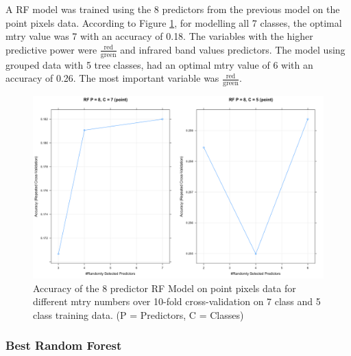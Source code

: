 \documentclass[12pt,twoside]{reedthesis}
\begin{document}
A RF model was trained using the 8 predictors from the previous model on the point pixels data. According to Figure \ref{fig:rf8c}, for modelling all 7 classes, the optimal mtry value was 7 with an accuracy of 0.18. The variables with the higher predictive power were \(\frac{\mbox{red}}{\mbox{green}}\) and infrared band values predictors. The model using grouped data with 5 tree classes, had an optimal mtry value of 6 with an accuracy of 0.26. The most important variable was \(\frac{\mbox{red}}{\mbox{green}}\).
\begin{figure}

{\centering \includegraphics[width=0.9\linewidth]{figure/rf8c_mtry} 

}

\caption{Accuracy of the 8 predictor RF Model on point pixels data for different mtry numbers over 10-fold cross-validation on 7 class and 5 class training data. (P = Predictors, C = Classes)}\label{fig:rf8c}
\end{figure}
\hypertarget{best-random-forest}{%
\subsubsection{Best Random Forest}\label{best-random-forest}}
\end{document}
